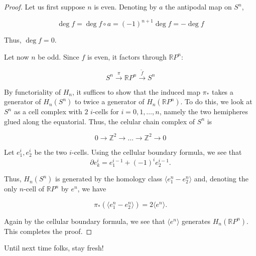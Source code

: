 \documentclass[a4paper, 12pt]{article}
\theoremstyle{definition}
\theoremstyle{plain}
\theoremstyle{remark}
\begin{document}
\begin{proof}
    Let us first suppose \( n \) is even. Denoting by \( a \) the antipodal map on \( S^n \),

    \begin{equation*}
        \deg f = \deg f \circ a = (-1)^{n+1} \deg f = - \deg f
    \end{equation*}

    Thus, \( \deg f = 0 \).

    Let now \( n \) be odd. Since \( f \) is even, it factors through \( \mathbb{R}P^n \):

    \begin{equation*}
        S^n \xrightarrow{\pi} \mathbb{R}P^n \xrightarrow{\widetilde{f}} S^n
    \end{equation*}

    By functoriality of \( H_n \), it suffices to show that the induced map \( \pi_* \) takes a generator of \( H_n(S^n) \) to twice a generator of \( H_n(\mathbb{R}P^n) \).
    To do this, we look at \( S^n \) as a cell complex with \( 2 \) \( i \)-cells for \( i = 0, 1, \dots, n \), namely the two hemipheres glued along the equatorial. Thus, the celular chain complex of \( S^n \) is

    \begin{equation*}
        0 \longrightarrow \mathbb{Z}^2 \longrightarrow \dots \longrightarrow \mathbb{Z}^2 \longrightarrow 0
    \end{equation*}

    Let \( e_1^i, e_2^i \) be the two \( i \)-cells. Using the cellular boundary formula, we see that
    \begin{equation*}
        \partial e_k^i = e_1^{i-1} + (-1)^{i}e_2^{i-1}.
    \end{equation*}

    Thus, \( H_n(S^n) \) is generated by the homology class \( \langle e^n_1 - e_2^n \rangle \) and, denoting the only \( n \)-cell of \( \mathbb{R}P^n \) by \( e^n \), we have

    \begin{equation*}
        \pi_*(\langle e^n_1 - e_2^n \rangle) = 2 \langle e^n \rangle.
    \end{equation*}

    Again by the cellular boundary formula, we see that \( \langle e^n \rangle \) generates \( H_n(\mathbb{R}P^n) \). This completes the proof.
\end{proof}

Until next time folks, stay fresh!
\end{document}
